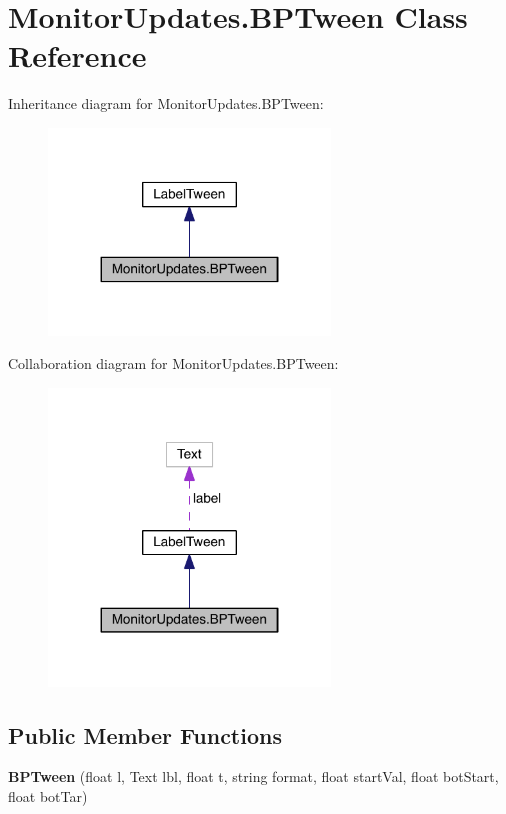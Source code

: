 \hypertarget{class_monitor_updates_1_1_b_p_tween}{}\section{Monitor\+Updates.\+B\+P\+Tween Class Reference}
\label{class_monitor_updates_1_1_b_p_tween}


Inheritance diagram for Monitor\+Updates.\+B\+P\+Tween\+:\nopagebreak
\begin{figure}[H]
\begin{center}
\leavevmode
\includegraphics[width=212pt]{class_monitor_updates_1_1_b_p_tween__inherit__graph}
\end{center}
\end{figure}


Collaboration diagram for Monitor\+Updates.\+B\+P\+Tween\+:\nopagebreak
\begin{figure}[H]
\begin{center}
\leavevmode
\includegraphics[width=212pt]{class_monitor_updates_1_1_b_p_tween__coll__graph}
\end{center}
\end{figure}
\subsection*{Public Member Functions}
\begin{DoxyCompactItemize}
\item 
{\bfseries B\+P\+Tween} (float l, Text lbl, float t, string format, float start\+Val, float bot\+Start, float bot\+Tar)\hypertarget{class_monitor_updates_1_1_b_p_tween_af79344953acaad6ab9a83cc7570ca66c}{}\label{class_monitor_updates_1_1_b_p_tween_af79344953acaad6ab9a83cc7570ca66c}

\end{DoxyCompactItemize}
